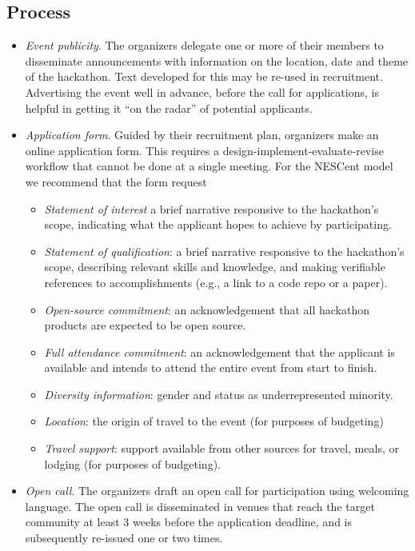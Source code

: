 \documentclass[11pt]{article}
\begin{document}
\subsection{Process}
\begin{itemize}
\item	{\em Event publicity}. The organizers delegate one or more of their members to disseminate announcements with information on the location, date and theme of the hackathon. Text developed for this may be re-used in recruitment. Advertising the event well in advance, before the call for applications, is helpful in getting it “on the radar” of potential applicants.
\item	{\em Application form}. Guided by their recruitment plan, organizers make an online application form. This requires a design-implement-evaluate-revise workflow that cannot be done at a single meeting. For the NESCent model we recommend that the form request 
\begin{itemize}
\item	{\em Statement of interest} a brief narrative responsive to the hackathon’s scope, indicating what the applicant hopes to achieve by participating. 
\item	{\em Statement of qualification}: a brief narrative responsive to the hackathon’s scope, describing relevant skills and knowledge, and making verifiable references to accomplishments (e.g., a link to a code repo or a paper).
\item	{\em Open-source commitment}: an acknowledgement that all hackathon products are expected to be open source. 
\item	{\em Full attendance commitment}: an acknowledgement that the applicant is available and intends to attend the entire event from start to finish. 
\item	{\em Diversity information}: gender and status as underrepresented minority. 
\item	{\em Location}: the origin of travel to the event (for purposes of budgeting)
\item	{\em Travel support}: support available from other sources for travel, meals, or lodging (for purposes of budgeting).  
\end{itemize}
\item	{\em Open call}. The organizers draft an open call for participation using welcoming language. The open call is disseminated in venues that reach the target community at least 3 weeks before the application deadline, and is subsequently re-issued one or two times.   

\end{itemize}
\end{document}
